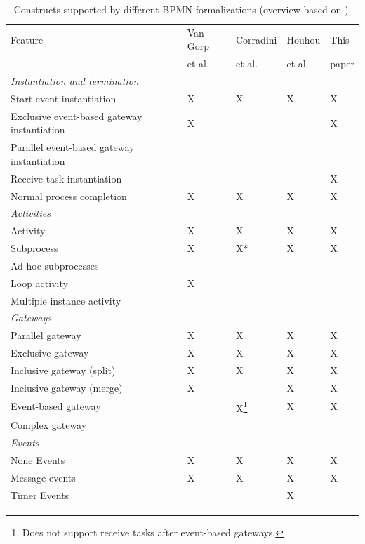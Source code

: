 \documentclass[adraft, copyright, creativecommons]{eptcs} %
\begin{document}
\begin{table}[htbp]
    \caption{Constructs supported by different BPMN formalizations (overview based on \cite{vangorpVisualTokenbasedFormalization2013}).}
    \label{tab:supportedconstructs}
    \begin{tabular}{l l l l l}
    \hline
      Feature & Van Gorp &  Corradini & Houhou & This\\
      & et al. \cite{vangorpVisualTokenbasedFormalization2013} & et al. \cite{corradiniFormalApproachAnalysis2021}& et al. \cite{houhouFirstOrderLogicVerification2022} & paper\\
      \hline
      \textit{Instantiation and termination} & &\\
      Start event instantiation & X & X & X & X\\
      Exclusive event-based gateway instantiation & X & & & X\\
      Parallel event-based gateway instantiation &  & & & \\
      Receive task instantiation & & & & X\\
      Normal process completion & X & X & X & X\\
      \textit{Activities} & & & &\\
      Activity & X & X & X & X\\
      Subprocess & X & X* & X & X\\
      Ad-hoc subprocesses & & & &\\
      Loop activity & X & & &\\
      Multiple instance activity & & & & \\
      \textit{Gateways} & & & &\\
      Parallel gateway & X & X & X & X\\
      Exclusive gateway & X & X & X & X\\
      Inclusive gateway (split) & X & X & X & X\\
      Inclusive gateway (merge) & X & & X & X\\
      Event-based gateway &  & X\footnote{Does not support receive tasks after event-based gateways.} & X & X\\ %
      Complex gateway & & & &\\
      \textit{Events} & & & & \\
      None Events & X & X & X & X\\
      Message events & X & X & X & X\\
      Timer Events & & & X & \\

\end{tabular}
\end{table}
\end{document}

